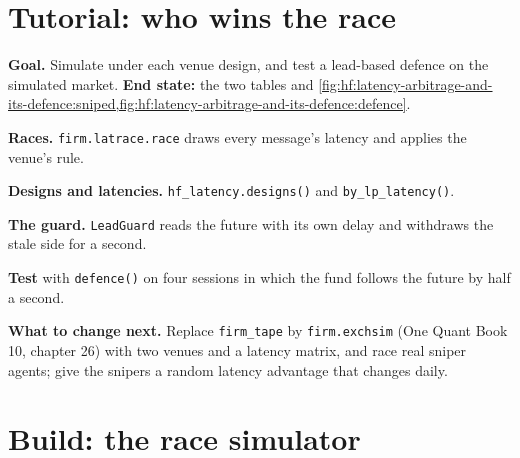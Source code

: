 \section{Tutorial: who wins the race}\label{tut:hf:latency-arbitrage-and-its-defence:tut}

\begin{tutorial}
\textbf{Goal.} Simulate  under each venue design, and test a lead-based defence on the simulated market. \textbf{End state:} the two
tables and \cref{fig:hf:latency-arbitrage-and-its-defence:sniped,fig:hf:latency-arbitrage-and-its-defence:defence}.
\begin{tutsteps}
\item \textbf{Races.} \texttt{firm.latrace.race} draws every message's latency and applies the venue's rule.
\label{lst:hf:latency-arbitrage-and-its-defence:race}
\item \textbf{Designs and latencies.} \texttt{hf\_latency.designs()} and \texttt{by\_lp\_latency()}.
\item \textbf{The guard.} \texttt{LeadGuard} reads the future with its own delay and withdraws the stale side for a second.
\label{lst:hf:latency-arbitrage-and-its-defence:guard}
\item \textbf{Test} with \texttt{defence()} on four sessions in which the fund follows the future by half a second.
\end{tutsteps}
\textbf{What to change next.} Replace \texttt{firm\_tape} by \texttt{firm.exchsim} (One Quant Book 10, chapter 26) with two venues and a latency
matrix, and race real sniper agents; give the snipers a random latency advantage that changes daily.
\end{tutorial}

\section{Build: the race simulator}\label{bld:hf:latency-arbitrage-and-its-defence:latrace}

